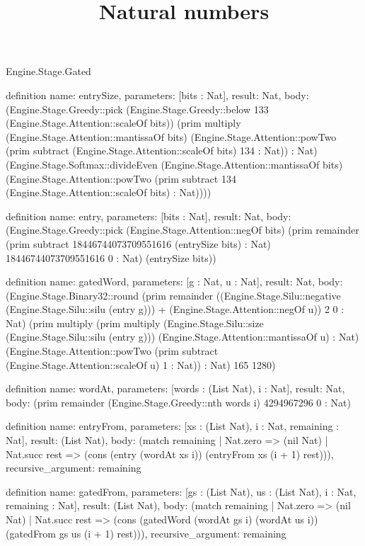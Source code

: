 \begin{lexlean}{Engine.Stage.Gated}
\title{Natural numbers}
\begin{semanticmodule}
definition{
  name: entrySize,
  parameters: [bits : Nat],
  result: Nat,
  body: (Engine.Stage.Greedy::pick (Engine.Stage.Greedy::below 133 (Engine.Stage.Attention::scaleOf bits)) (prim multiply (Engine.Stage.Attention::mantissaOf bits) (Engine.Stage.Attention::powTwo (prim subtract (Engine.Stage.Attention::scaleOf bits) 134 : Nat)) : Nat) (Engine.Stage.Softmax::divideEven (Engine.Stage.Attention::mantissaOf bits) (Engine.Stage.Attention::powTwo (prim subtract 134 (Engine.Stage.Attention::scaleOf bits) : Nat))))
}

definition{
  name: entry,
  parameters: [bits : Nat],
  result: Nat,
  body: (Engine.Stage.Greedy::pick (Engine.Stage.Attention::negOf bits) (prim remainder (prim subtract 18446744073709551616 (entrySize bits) : Nat) 18446744073709551616 0 : Nat) (entrySize bits))
}

definition{
  name: gatedWord,
  parameters: [g : Nat, u : Nat],
  result: Nat,
  body: (Engine.Stage.Binary32::round (prim remainder ((Engine.Stage.Silu::negative (Engine.Stage.Silu::silu (entry g))) + (Engine.Stage.Attention::negOf u)) 2 0 : Nat) (prim multiply (prim multiply (Engine.Stage.Silu::size (Engine.Stage.Silu::silu (entry g))) (Engine.Stage.Attention::mantissaOf u) : Nat) (Engine.Stage.Attention::powTwo (prim subtract (Engine.Stage.Attention::scaleOf u) 1 : Nat)) : Nat) 165 1280)
}

definition{
  name: wordAt,
  parameters: [words : (List Nat), i : Nat],
  result: Nat,
  body: (prim remainder (Engine.Stage.Greedy::nth words i) 4294967296 0 : Nat)
}

definition{
  name: entryFrom,
  parameters: [xs : (List Nat), i : Nat, remaining : Nat],
  result: (List Nat),
  body: (match remaining
    | Nat.zero => (nil Nat)
    | Nat.succ rest => (cons (entry (wordAt xs i)) (entryFrom xs (i + 1) rest))),
  recursive_argument: remaining
}

definition{
  name: gatedFrom,
  parameters: [gs : (List Nat), us : (List Nat), i : Nat, remaining : Nat],
  result: (List Nat),
  body: (match remaining
    | Nat.zero => (nil Nat)
    | Nat.succ rest => (cons (gatedWord (wordAt gs i) (wordAt us i)) (gatedFrom gs us (i + 1) rest))),
  recursive_argument: remaining
}
\end{semanticmodule}
\end{lexlean}
